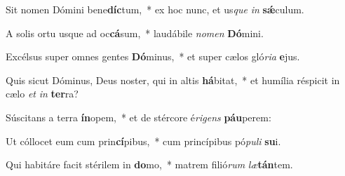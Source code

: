 \item Sit nomen Dómini bene\textbf{díc}tum,~* ex hoc nunc, et us\textit{que} \textit{in} \textbf{sǽ}culum.
\item A solis ortu usque ad oc\textbf{cá}sum,~* laudábile \textit{no}\textit{men} \textbf{Dó}mini.
\item Excélsus super omnes gentes \textbf{Dó}minus,~* et super cælos gló\textit{ri}\textit{a} \textbf{e}jus.
\item Quis sicut Dóminus, Deus noster, qui in altis \textbf{há}bitat,~* et humília réspicit in cælo \textit{et} \textit{in} \textbf{ter}ra?
\item Súscitans a terra \textbf{ín}opem,~* et de stércore é\textit{ri}\textit{gens} \textbf{páu}perem:
\item Ut cóllocet eum cum prin\textbf{cí}pibus,~* cum princípibus pó\textit{pu}\textit{li} \textbf{su}i.
\item Qui habitáre facit stérilem in \textbf{do}mo,~* matrem filió\textit{rum} \textit{læ}\textbf{tán}tem.
